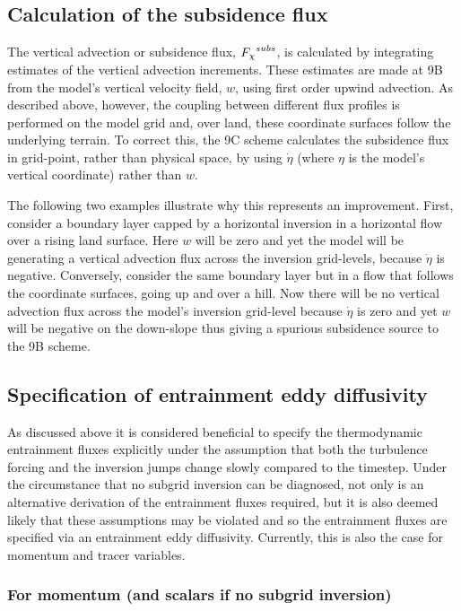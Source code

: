 \documentclass{UMDP_article}
\begin{document}
\subsection{Calculation of the subsidence flux}
\label{sec:subs_calc}

The vertical advection or subsidence flux, ${F_{\chi}}^{subs}$, is
calculated by integrating estimates of the vertical advection
increments.  These estimates are made at 9B from the model's vertical
velocity field, $w$, using first order upwind advection.  As described
above, however, the coupling between different flux profiles is
performed on the model grid and, over land, these coordinate surfaces
follow the underlying terrain.  To correct this, the 9C scheme
calculates the subsidence flux in grid-point, rather than physical
space, by using $\dot{\eta}$ (where $\eta$ is the model's vertical
coordinate) rather than $w$.

The following two examples illustrate why this represents an
improvement.  First, consider a boundary layer capped by a horizontal
inversion in a horizontal flow over a rising land surface.  Here $w$
will be zero and yet the model will be generating a vertical advection
flux across the inversion grid-levels, because $\dot{\eta}$ is
negative.  Conversely, consider the same boundary layer but in a flow
that follows the coordinate surfaces, going up and over a hill.  Now
there will be no vertical advection flux across the model's inversion
grid-level because $\dot{\eta}$ is zero and yet $w$ will be negative
on the down-slope thus giving a spurious subsidence source to the 9B
scheme.


\subsection{Specification of entrainment eddy diffusivity}

As discussed above it is considered beneficial to specify the
thermodynamic entrainment fluxes explicitly under the assumption that
both the turbulence forcing and the inversion jumps change slowly
compared to the timestep.  Under the circumstance that no subgrid
inversion can be diagnosed, not only is an alternative derivation of
the entrainment fluxes required, but it is also deemed likely that
these assumptions may be violated and so the entrainment fluxes are
specified via an entrainment eddy diffusivity.  Currently, this is
also the case for momentum and tracer variables.

\subsubsection{For momentum (and scalars if no subgrid inversion)}
\label{sec:ent_K}
\end{document}
